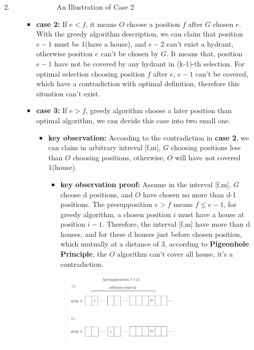 \documentclass[12pt,a4paper]{article}
\makeatletter
\newtheorem*{solution}{Solution}
\theoremstyle{definition}
\renewenvironment{solution}[1][Solution] {\par\pushQED{\qed}\normalfont\topsep6\p@\@plus6\p@\relax\trivlist\item[\hskip\labelsep\bfseries#1\@addpunct{.}]\ignorespaces}{\popQED\endtrivlist\@endpefalse} \makeatother
\makeatother
\begin{document}
\begin{enumerate}
\begin{solution}
\begin{itemize}
\begin{itemize}
\begin{figure}[htbp]
                \caption{An Illustration of Case 2}\label{1_1}
            \end{figure}
    		\item  \textbf{case 2:} If $e<f$, it means $O$ choose a position $f$ after $G$ chosen $e$. With the greedy algorithm description, we can claim that position $e-1$ must be 1(have a house), and $e-2$ can't exist a hydrant, otherwise position $e$ can't be chosen by $G$. It means that, position $e-1$ have not be covered by any hydrant in (k-1)-th selection. For optimal selection choosing position $f$ after $e$, $e-1$ can't be covered, which have a contradiction with optimal definition, therefore this situation can't exist. 
    		\item  \textbf{case 3:} If $e>f$, greedy algorithm choose a later position than optimal algorithm, we can devide this case into two small one.
    		\begin{itemize}
    			\item []\textbf{key observation:} According to the contradiction in \textbf{case 2}, we can claim in arbitrary intreval [f,m], $G$ choosing positions less than $O$ choosing positions, otherwise, $O$ will have not covered 1(house). 
    			\begin{itemize}
    				\item \textbf{key observation proof:}
    				Assume in the interval [f,m], $G$ choose d positions, and $O$ have chosen no more than d-1 positions. The presupposition $e > f$ means $f\leq e-1$, for greedy algorithm, a chosen position $i$ must have a house at position $i-1$. Therefore, the interval [f,m] have more than d houses, and for these d houses just before chosen position, which mutually at a distance of 3, according to \textbf{Pigeonhole Principle}, the $O$ algorithm can't cover all house, it's a contradiction. 
    			\end{itemize}
    			\begin{figure}[htbp]
                    \centering
                    \includegraphics[width=0.63\textwidth]{figures/1_2.pdf}

\end{figure}
\end{itemize}
\end{itemize}
\end{itemize}
\end{solution}
\end{enumerate}
\end{document}
